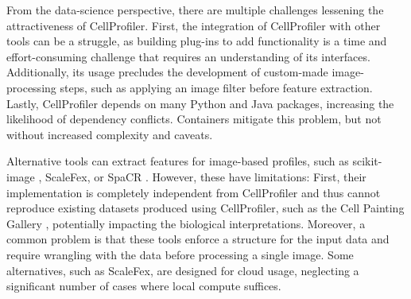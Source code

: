 \documentclass{article}
\begin{document}
From the data-science perspective, there are multiple challenges lessening the attractiveness of CellProfiler. First, the integration of CellProfiler with other tools can be a struggle, as building plug-ins to add functionality is a time and effort-consuming challenge that requires an understanding of its interfaces. Additionally, its usage precludes the development of custom-made image-processing steps, such as applying an image filter before feature extraction. Lastly, CellProfiler depends on many Python and Java packages, increasing the likelihood of dependency conflicts. Containers mitigate this problem, but not without increased complexity and caveats.

Alternative tools can extract features for image-based profiles, such as scikit-image \citep{waltScikitimageImageProcessing2014}, ScaleFex, or SpaCR \citep{comoletHighlyEfficientScalable2024,einarolafssonSpaCr2025} . However, these have limitations: First, their implementation is completely independent from CellProfiler and thus cannot reproduce existing datasets produced using CellProfiler, such as the Cell Painting Gallery \cite{weisbartCellPaintingGallery2024,fayRxRx3PhenomicsMap2023}, potentially impacting the biological interpretations. Moreover, a common problem is that these tools enforce a structure for the input data and require wrangling with the data before processing a single image. Some alternatives, such as ScaleFex, are designed for cloud usage, neglecting a significant number of cases where local compute suffices. 
\end{document}
